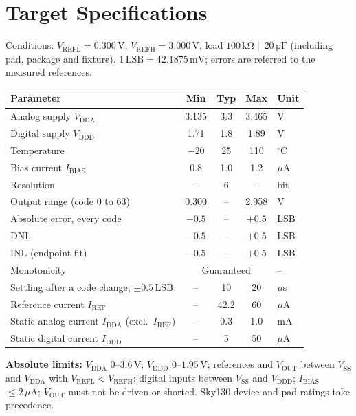\documentclass[10pt,a4paper]{article}
\newcommand{\vrefh}{\ensuremath{V_{\mathrm{REFH}}}}
\newcommand{\vrefl}{\ensuremath{V_{\mathrm{REFL}}}}
\newcommand{\vout}{\ensuremath{V_{\mathrm{OUT}}}}
\newcommand{\vdda}{\ensuremath{V_{\mathrm{DDA}}}}
\newcommand{\vddd}{\ensuremath{V_{\mathrm{DDD}}}}
\newcommand{\vssa}{\ensuremath{V_{\mathrm{SS}}}}
\newcommand{\ibias}{\ensuremath{I_{\mathrm{BIAS}}}}
\newcommand{\idda}{\ensuremath{I_{\mathrm{DDA}}}}
\newcommand{\iddd}{\ensuremath{I_{\mathrm{DDD}}}}
\newcommand{\iref}{\ensuremath{I_{\mathrm{REF}}}}
\begin{document}
\section{Target Specifications}
Conditions: $\vrefl = 0.300\,\mathrm{V}$, $\vrefh = 3.000\,\mathrm{V}$, load $100\,\mathrm{k\Omega} \parallel 20\,\mathrm{pF}$ (including pad, package and fixture). $1\,\mathrm{LSB} = 42.1875\,\mathrm{mV}$; errors are referred to the measured references.
\begin{table}[H]
  \centering
  \begin{tabular}{@{}l c c c l@{}}
    \toprule
    \textbf{Parameter} & \textbf{Min} & \textbf{Typ} & \textbf{Max} & \textbf{Unit} \\
    \midrule
    Analog supply \vdda                   & 3.135 & 3.3   & 3.465 & V \\
    Digital supply \vddd                  & 1.71  & 1.8   & 1.89  & V \\
    Temperature                           & $-20$ & 25    & 110   & $^\circ$C \\
    Bias current \ibias                   & 0.8   & 1.0   & 1.2   & $\mu$A \\
    Resolution                            & --    & 6     & --    & bit \\
    Output range (code 0 to 63)           & 0.300 & --    & 2.958 & V \\
    Absolute error, every code            & $-0.5$ & --   & $+0.5$ & LSB \\
    DNL                                   & $-0.5$ & --   & $+0.5$ & LSB \\
    INL (endpoint fit)                    & $-0.5$ & --   & $+0.5$ & LSB \\
    Monotonicity                          & \multicolumn{3}{c}{Guaranteed} & -- \\
    Settling after a code change, $\pm 0.5\,\mathrm{LSB}$ & -- & 10 & 20 & $\mu$s \\
    Reference current \iref               & --    & 42.2  & 60    & $\mu$A \\
    Static analog current \idda{} (excl.\ \iref) & -- & 0.3 & 1.0 & mA \\
    Static digital current \iddd          & --    & 5     & 50    & $\mu$A \\
    \bottomrule
  \end{tabular}
\end{table}

\textbf{Absolute limits:} \vdda{} $0$--$3.6\,\mathrm{V}$; \vddd{} $0$--$1.95\,\mathrm{V}$; references and \vout{} between \vssa{} and \vdda{} with $\vrefl < \vrefh$; digital inputs between \vssa{} and \vddd{}; \ibias{} $\leq 2\,\mu\mathrm{A}$; \vout{} must not be driven or shorted. Sky130 device and pad ratings take precedence.
\end{document}
